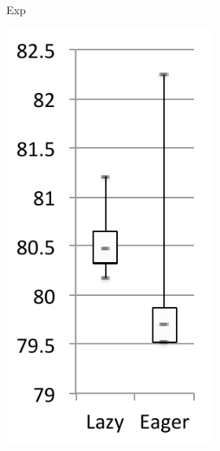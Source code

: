 \documentclass[sigplan,10pt,review,anonymous]{acmart}\settopmatter{printfolios=true,printccs=false,printacmref=false}
\begin{document}
\begin{figure}[bth]
\begin{subfigure}[b]{.48\textwidth}
\begin{subfigure}[b]{.28\textwidth}
		\caption{Exp}
   	\end{subfigure}\hspace{.03\textwidth}%
	\begin{subfigure}[b]{.28\textwidth}
		\includegraphics[width=\linewidth]{figures/netBeansExpCacheExecTime} 

\end{subfigure}
\end{subfigure}
\end{figure}
\end{document}

